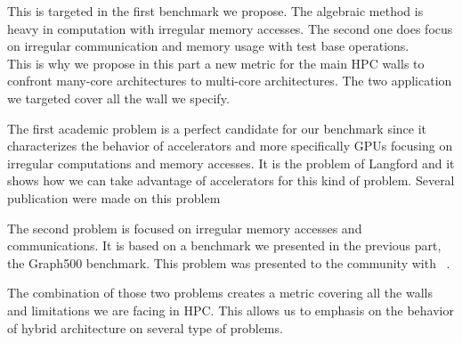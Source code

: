This is targeted in the first benchmark we propose. 
The algebraic method is heavy in computation with irregular memory accesses. 
The second one does focus on irregular communication and memory usage with test base operations.\\

This is why we propose in this part a new metric for the main HPC walls to confront many-core architectures to multi-core architectures. 
The two application we targeted cover all the wall we specify. 

The first academic problem is a perfect candidate for our benchmark since it characterizes the behavior of accelerators and more specifically GPUs focusing on irregular computations and memory accesses. 
It is the problem of Langford and it shows how we can take advantage of accelerators for this kind of problem.
Several publication were made on this problem ~\cite{krajecki2016many,deleau2014towards,j2016resolution,jaillet2014Langford} 

The second problem is focused on irregular memory accesses and communications. 
It is based on a benchmark we presented in the previous part, the Graph500 benchmark.
This problem was presented to the community with ~\cite{krajecki2016bfs,loiseau2015parcours,loiseau2015GTC}.

The combination of those two problems creates a metric covering all the walls and limitations we are facing in HPC. 
This allows us to emphasis on the behavior of hybrid architecture on several type of problems.
